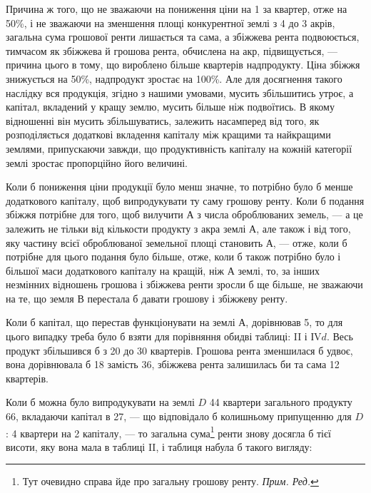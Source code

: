 
Причина ж того, що не зважаючи на пониження ціни на 1
за квартер, отже на 50\%, і не зважаючи на зменшення площі конкурентної
землі з 4 до 3 акрів, загальна сума грошової ренти лишається та сама, а збіжжева
рента подвоюється, тимчасом як збіжжева й грошова рента, обчислена на акр, підвищується,
— причина цього в тому, що вироблено більше квартерів надпродукту.
Ціна збіжжя знижується на 50\%, надпродукт зростає на 100\%.
Але для досягнення такого наслідку вся продукція, згідно з нашими умовами,
мусить збільшитись утроє, а капітал, вкладений у кращу землю, мусить більше
ніж подвоїтись. В якому відношенні він мусить збільшуватись, залежить насамперед
від того, як розподіляється додаткові вкладення капіталу між кращими та
найкращими землями, припускаючи завжди, що продуктивність капіталу на
кожній категорії землі зростає пропорційно його величині.

Коли б пониження ціни продукції було менш значне, то потрібно було б
менше додаткового капіталу, щоб випродукувати ту саму грошову ренту. Коли б
подання збіжжя потрібне для того, щоб вилучити $А$ з числа оброблюваних земель,
— а це залежить не тільки від кількости продукту з акра землі $А$, але
також і від того, яку частину всієї оброблюваної земельної площі становить $А$, —
отже, коли б потрібне для цього подання було більше, отже, коли б також
потрібно було і більшої маси додаткового капіталу на кращій, ніж $А$ землі, то,
за інших незмінних відношень грошова і збіжжева ренти зросли б ще більше,
не зважаючи на те, що земля $В$ перестала б давати грошову і збіжжеву ренту.

Коли б капітал, що перестав функціонувати на землі $А$, дорівнював 5, то для цього випадку треба було б взяти для порівняння обидві таблиці:
II і ІV$d$. Весь продукт збільшився б з 20 до 30 квартерів. Грошова рента
зменшилася б удвоє, вона дорівнювала б 18 замість 36,
збіжжева рента залишилась би та сама \deq{} 12 квартерів.

Коли б можна було випродукувати на землі $D$ 44 квартери загального
продукту \deq{} 66, вкладаючи капітал в 27, — що відповідало б
колишньому припущенню для $D$: 4 квартери на 2 капіталу, —
то загальна сума\footnote*{
Тут очевидно справа йде про загальну грошову ренту. \emph{Прим. Ред.}
} ренти знову досягла б тієї висоти, яку вона мала в таблиці
II, і таблиця набула б такого вигляду:

